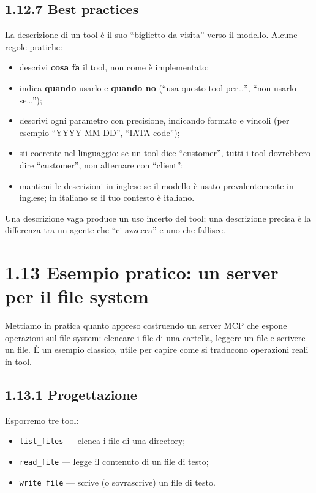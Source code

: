 \documentclass[
  italian,
  10pt,
]{book}
\providecommand{\tightlist}{%
  \setlength{\itemsep}{0pt}\setlength{\parskip}{0pt}}
\begin{document}
\subsection{1.12.7 Best practices}\label{best-practices}

La descrizione di un tool è il suo ``biglietto da visita'' verso il
modello. Alcune regole pratiche:

\begin{itemize}
\tightlist
\item
  descrivi \textbf{cosa fa} il tool, non come è implementato;
\item
  indica \textbf{quando} usarlo e \textbf{quando no} (``usa questo tool
  per\ldots{}'', ``non usarlo se\ldots{}'');
\item
  descrivi ogni parametro con precisione, indicando formato e vincoli
  (per esempio ``YYYY-MM-DD'', ``IATA code'');
\item
  sii coerente nel linguaggio: se un tool dice ``customer'', tutti i
  tool dovrebbero dire ``customer'', non alternare con ``client'';
\item
  mantieni le descrizioni in inglese se il modello è usato
  prevalentemente in inglese; in italiano se il tuo contesto è italiano.
\end{itemize}

Una descrizione vaga produce un uso incerto del tool; una descrizione
precisa è la differenza tra un agente che ``ci azzecca'' e uno che
fallisce.

\section{1.13 Esempio pratico: un server per il file
system}\label{esempio-pratico-un-server-per-il-file-system}

Mettiamo in pratica quanto appreso costruendo un server MCP che espone
operazioni sul file system: elencare i file di una cartella, leggere un
file e scrivere un file. È un esempio classico, utile per capire come si
traducono operazioni reali in tool.

\subsection{1.13.1 Progettazione}\label{progettazione}

Esporremo tre tool:

\begin{itemize}
\tightlist
\item
  \texttt{list\_files} --- elenca i file di una directory;
\item
  \texttt{read\_file} --- legge il contenuto di un file di testo;
\item
  \texttt{write\_file} --- scrive (o sovrascrive) un file di testo.
\end{itemize}
\end{document}
